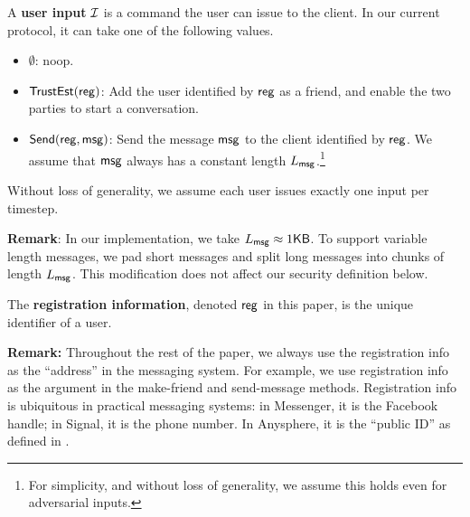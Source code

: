 \begin{definition}
\label{defn:messaging-user-input}
A \textbf{user input} $\mathcal{I}$ is a command the user can issue to the client. In our current protocol, it can take one of the following values.
\begin{itemize}
    \item $\emptyset$: noop.
    \item $\mathsf{TrustEst}(\mathsf{reg})$: Add the user identified by $\mathsf{reg}$ as a friend, and enable the two parties to start a conversation.
    \item $\mathsf{Send}(\mathsf{reg}, \mathsf{msg})$: Send the message $\mathsf{msg}$ to the client identified by $\mathsf{reg}$. We assume that $\mathsf{msg}$ always has a constant length $L_{\mathsf{msg}}$.\footnote{For simplicity, and without loss of generality, we assume this holds even for adversarial inputs.}
\end{itemize}

Without loss of generality, we assume each user issues exactly one input per timestep.
\end{definition}
\textbf{Remark}:  In our implementation, we take $L_{\mathsf{msg}} \approx 1\mathsf{KB}$. To support variable length messages, we pad short messages and split long messages into chunks of length $L_{\mathsf{msg}}$. This modification does not affect our security definition below.
\begin{definition}
\label{defn:messaging-registration-info}
The \textbf{registration information}, denoted $\mathsf{reg}$ in this paper, is the unique identifier of a user.
\end{definition}
\textbf{Remark: }Throughout the rest of the paper, we  always use the registration info as the ``address'' in the messaging system. For example, we  use registration info as the argument in the make-friend and send-message methods. Registration info is ubiquitous in practical messaging systems: in Messenger, it is the Facebook handle; in Signal, it is the phone number. In Anysphere, it is the ``public ID'' as defined in \cite[Figure 6]{whitepaper}.

